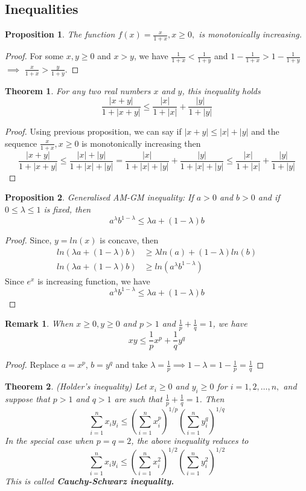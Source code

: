 \documentclass[12pt]{report}
\newtheorem{thm}{Theorem}
\newtheorem*{rem}{Remark}
\newtheorem{prop}{Proposition}
\begin{document}
\subsection*{Inequalities}
\begin{prop}
    The function $f(x) = \frac{x}{1+x}, x \geq 0,$ is monotonically increasing. 
\end{prop}
\begin{proof}
    For some $x, y \geq 0$ and $x > y$, we have $\frac{1}{1+x} < \frac{1}{1+y}$ and $1-\frac{1}{1+x} > 1-\frac{1}{1+y}$ $\implies$ $ \frac{x}{1+x} > \frac{y}{1+y}$. 
\end{proof}
\begin{thm}
    For any two real numbers $x$ and $y$, this inequality holds
    $$ \frac{|x+y|}{1+|x+y|} \leq \frac{|x|}{1+|x|} + \frac{|y|}{1+|y|}$$
\end{thm}
\begin{proof}
    Using previous proposition, we can say if $|x+y| \leq |x| + |y|$ and the sequence $\frac{x}{1+x}, x \geq 0$ is monotonically increasing then
    $$ \frac{|x+y|}{1+|x+y|} \leq \frac{|x| + |y|}{1+ |x| + |y|} = \frac{|x|}{1+|x| + |y|} + \frac{|y|}{1+|x| + |y|} \leq \frac{|x|}{1+|x|} + \frac{|y|}{1+|y|}$$ 
\end{proof}
\begin{prop}
    Generalised AM-GM inequality: If $a > 0$ and $b > 0$ and if $0 \leq \lambda \leq 1$ is fixed, then
    $$ a^{\lambda}b^{1-\lambda} \leq \lambda a + (1-\lambda)b$$ 
\end{prop}
\begin{proof}
    Since, $ y = ln(x)$ is concave, then
    \begin{align*}
        ln(\lambda a + (1-\lambda)b) &\geq \lambda ln(a) + (1-\lambda)ln(b)\\
        ln(\lambda a + (1-\lambda)b) &\geq ln(a^{\lambda} b^{1-\lambda})
    \end{align*}
Since $e^x$ is increasing function, we have
$$ a^{\lambda} b^{1-\lambda} \leq \lambda a + (1-\lambda)b$$
\end{proof}
\begin{rem}
    When $x \geq 0, y \geq 0$ and $p > 1$ and $\frac{1}{p} + \frac{1}{q} = 1$, we have 
    $$ xy \leq \frac{1}{p}x^p + \frac{1}{q}y^q$$
\end{rem}
\begin{proof}
    Replace $ a = x^p$, $b = y^q$ and take $\lambda = \frac{1}{p} \implies 1-\lambda = 1- \frac{1}{p} = \frac{1}{q}$
\end{proof}
\begin{thm}
    (Holder's inequality) Let $x_i \geq 0$ and $y_i \geq 0$ for $i = 1,2, \dots, n,$ and suppose that $p > 1$ and $q > 1$ are such that $\frac{1}{p} + \frac{1}{q} = 1$. Then
    $$ \sum\limits_{i=1}^n x_iy_i \leq \left(\sum\limits_{i=1}^nx_i^p\right)^{1/p} \left(\sum\limits_{i=1}^ny_i^q\right)^{1/q}$$
    In the special case when $p = q = 2$, the above inequality reduces to 
    $$ \sum\limits_{i=1}^n x_iy_i \leq \left(\sum\limits_{i=1}^nx_i^2\right)^{1/2} \left(\sum\limits_{i=1}^ny_i^2\right)^{1/2}$$
    This is called \textbf{Cauchy-Schwarz inequality.}
\end{thm}
\end{document}
